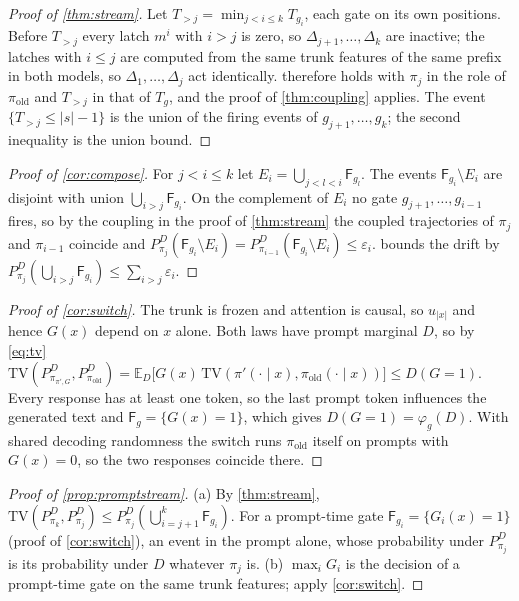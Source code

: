 \documentclass{article}
\theoremstyle{plain}
\theoremstyle{definition}
\theoremstyle{remark}
\newcommand{\E}{\mathbb{E}}
\newcommand{\TV}{\mathrm{TV}}
\newcommand{\pold}{\pi_{\mathrm{old}}}
\newcommand{\Fire}{\mathsf{F}}
\begin{document}
\begin{proof}[Proof of \cref{thm:stream}]
Let $T_{>j}=\min_{j<i\le k}T_{g_i}$, each gate on its own positions. Before $T_{>j}$ every latch $m^i$ with $i>j$ is zero, so
$\Delta_{j+1},\dots,\Delta_k$ are inactive; the latches with $i\le j$ are computed from the same trunk features of
the same prefix in both models, so $\Delta_1,\dots,\Delta_j$ act identically.  therefore holds
with $\pi_j$ in the role of $\pold$ and $T_{>j}$ in that of $T_g$, and the proof of \cref{thm:coupling} applies. The
event $\{T_{>j}\le|s|-1\}$ is the union of the firing events of $g_{j+1},\dots,g_k$; the second inequality is the union bound.
\end{proof}

\begin{proof}[Proof of \cref{cor:compose}]
For $j<i\le k$ let $E_i=\bigcup_{j<l<i}\Fire_{g_l}$. The events $\Fire_{g_i}\setminus E_i$ are disjoint with union
$\bigcup_{i>j}\Fire_{g_i}$. On the complement of $E_i$ no gate $g_{j+1},\dots,g_{i-1}$ fires, so by the coupling in the proof of
\cref{thm:stream} the coupled trajectories of $\pi_j$ and $\pi_{i-1}$ coincide and
$P^D_{\pi_j}(\Fire_{g_i}\setminus E_i)=P^D_{\pi_{i-1}}(\Fire_{g_i}\setminus E_i)\le\varepsilon_i$.
 bounds the drift by $P^D_{\pi_j}(\bigcup_{i>j}\Fire_{g_i})\le\sum_{i>j}\varepsilon_i$.
\end{proof}

\begin{proof}[Proof of \cref{cor:switch}]
The trunk is frozen and attention is causal, so $u_{|x|}$ and hence $G(x)$ depend on $x$ alone. Both laws have
prompt marginal $D$, so by \cref{eq:tv}
$\TV(P^D_{\pi_{\pi',G}},P^D_{\pold})=\E_D\big[G(x)\,\TV(\pi'(\cdot\mid x),\pold(\cdot\mid x))\big]\le D(G=1)$. Every
response has at least one token, so the last prompt token influences the generated text and
$\Fire_g=\{G(x)=1\}$, which gives $D(G=1)=\varphi_g(D)$. With shared decoding randomness the switch runs $\pold$ itself
on prompts with $G(x)=0$, so the two responses coincide there.
\end{proof}

\begin{proof}[Proof of \cref{prop:promptstream}]
(a) By \cref{thm:stream}, $\TV(P^D_{\pi_k},P^D_{\pi_j})\le P^D_{\pi_j}(\bigcup_{i=j+1}^k\Fire_{g_i})$. For a prompt-time
gate $\Fire_{g_i}=\{G_i(x)=1\}$ (proof of \cref{cor:switch}), an event in the prompt alone, whose probability
under $P^D_{\pi_j}$ is its probability under $D$ whatever $\pi_j$ is. (b) $\max_iG_i$ is the decision of a
prompt-time gate on the same trunk features; apply \cref{cor:switch}.
\end{proof}
\end{document}
